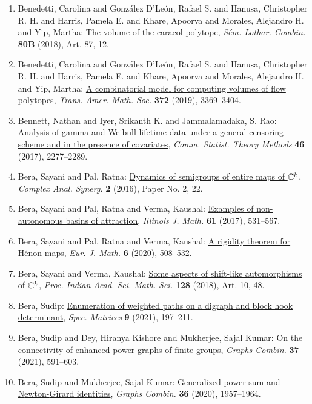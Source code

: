 \begin{enumerate}
\item Benedetti, Carolina and Gonz\'{a}lez D'Le\'{o}n, Rafael S. and Hanusa,
Christopher R. H. and Harris, Pamela E. and Khare, Apoorva and
Morales, Alejandro H. and Yip, Martha: The volume of the caracol polytope, \emph{S\'{e}m. Lothar. Combin.} {\bf 80B} (2018), Art. 87, 12.
\item Benedetti, Carolina and Gonz\'{a}lez D'Le\'{o}n, Rafael S. and Hanusa,
Christopher R. H. and Harris, Pamela E. and Khare, Apoorva and
Morales, Alejandro H. and Yip, Martha: \href{https://doi.org/10.1090/tran/7743}{A combinatorial model for computing volumes of flow polytopes}, \emph{Trans. Amer. Math. Soc.} {\bf 372} (2019), 3369--3404.
\item Bennett, Nathan and Iyer, Srikanth K. and Jammalamadaka, S.
Rao: \href{https://doi.org/10.1080/03610926.2015.1041981}{Analysis of gamma and {W}eibull lifetime data under a general
censoring scheme and in the presence of covariates}, \emph{Comm. Statist. Theory Methods} {\bf 46} (2017), 2277--2289.
\item Bera, Sayani and Pal, Ratna: \href{https://doi.org/10.1186/s40627-016-0006-x}{Dynamics of semigroups of entire maps of {$\Bbb{C}^k$}}, \emph{Complex Anal. Synerg.} {\bf 2} (2016), Paper No. 2, 22.
\item Bera, Sayani and Pal, Ratna and Verma, Kaushal: \href{https://projecteuclid.org/euclid.ijm/1534924839}{Examples of non-autonomous basins of attraction}, \emph{Illinois J. Math.} {\bf 61} (2017), 531--567.
\item Bera, Sayani and Pal, Ratna and Verma, Kaushal: \href{https://doi.org/10.1007/s40879-019-00326-7}{A rigidity theorem for {H}\'{e}non maps}, \emph{Eur. J. Math.} {\bf 6} (2020), 508--532.
\item Bera, Sayani and Verma, Kaushal: \href{https://doi.org/10.1007/s12044-018-0388-1}{Some aspects of shift-like automorphisms of {$\Bbb C^k$}}, \emph{Proc. Indian Acad. Sci. Math. Sci.} {\bf 128} (2018), Art. 10, 48.
\item Bera, Sudip: \href{https://doi.org/10.1515/spma-2020-0130}{Enumeration of weighted paths on a digraph and block hook
determinant}, \emph{Spec. Matrices} {\bf 9} (2021), 197--211.
\item Bera, Sudip and Dey, Hiranya Kishore and Mukherjee, Sajal
Kumar: \href{https://doi.org/10.1007/s00373-020-02267-5}{On the connectivity of enhanced power graphs of finite groups}, \emph{Graphs Combin.} {\bf 37} (2021), 591--603.
\item Bera, Sudip and Mukherjee, Sajal Kumar: \href{https://doi.org/10.1007/s00373-020-02223-3}{Generalized power sum and {N}ewton-{G}irard identities}, \emph{Graphs Combin.} {\bf 36} (2020), 1957--1964.

\end{enumerate}
